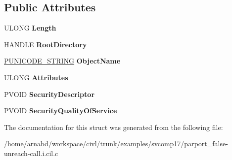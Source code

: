 \subsection*{Public Attributes}
\begin{DoxyCompactItemize}
\item 
\hypertarget{struct__OBJECT__ATTRIBUTES_aef711aa35ccec0e59ce380d836d436d1}{}U\+L\+O\+N\+G {\bfseries Length}\label{struct__OBJECT__ATTRIBUTES_aef711aa35ccec0e59ce380d836d436d1}

\item 
\hypertarget{struct__OBJECT__ATTRIBUTES_a81a3a1fa5c45cc06208aeb85e98af656}{}H\+A\+N\+D\+L\+E {\bfseries Root\+Directory}\label{struct__OBJECT__ATTRIBUTES_a81a3a1fa5c45cc06208aeb85e98af656}

\item 
\hypertarget{struct__OBJECT__ATTRIBUTES_adf5386ea5bbc4e46ee5df278d83fc3bd}{}\hyperlink{struct__UNICODE__STRING}{P\+U\+N\+I\+C\+O\+D\+E\+\_\+\+S\+T\+R\+I\+N\+G} {\bfseries Object\+Name}\label{struct__OBJECT__ATTRIBUTES_adf5386ea5bbc4e46ee5df278d83fc3bd}

\item 
\hypertarget{struct__OBJECT__ATTRIBUTES_a1d8b689e2a58e2636ad7ab487a4fb365}{}U\+L\+O\+N\+G {\bfseries Attributes}\label{struct__OBJECT__ATTRIBUTES_a1d8b689e2a58e2636ad7ab487a4fb365}

\item 
\hypertarget{struct__OBJECT__ATTRIBUTES_adfce0bf43dbfa60476b4d786c7d78610}{}P\+V\+O\+I\+D {\bfseries Security\+Descriptor}\label{struct__OBJECT__ATTRIBUTES_adfce0bf43dbfa60476b4d786c7d78610}

\item 
\hypertarget{struct__OBJECT__ATTRIBUTES_a9fe901e278495c5490b3288d26636482}{}P\+V\+O\+I\+D {\bfseries Security\+Quality\+Of\+Service}\label{struct__OBJECT__ATTRIBUTES_a9fe901e278495c5490b3288d26636482}

\end{DoxyCompactItemize}


The documentation for this struct was generated from the following file\+:\begin{DoxyCompactItemize}
\item 
/home/arnabd/workspace/civl/trunk/examples/svcomp17/parport\+\_\+false-\/unreach-\/call.\+i.\+cil.\+c\end{DoxyCompactItemize}
